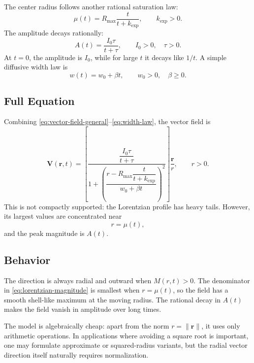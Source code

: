 \documentclass[a4paper,12pt]{article}
\begin{document}
The center radius follows another rational saturation law:
\begin{equation}
    \mu(t)
    =
    R_{\max}\frac{t}{t+k_{\mathrm{exp}}},
    \qquad k_{\mathrm{exp}}>0.
    \label{eq:center-radius}
\end{equation}
The amplitude decays rationally:
\begin{equation}
    A(t)
    =
    \frac{I_0\tau}{t+\tau},
    \qquad I_0>0,\quad \tau>0.
    \label{eq:amplitude-decay}
\end{equation}
At \(t=0\), the amplitude is \(I_0\), while for large \(t\) it decays like
\(1/t\). A simple diffusive width law is
\begin{equation}
    w(t)=w_0+\beta t,
    \qquad w_0>0,\quad \beta\ge 0.
    \label{eq:width-law}
\end{equation}

\subsection{Full Equation}

Combining \eqref{eq:vector-field-general}--\eqref{eq:width-law}, the vector
field is
\begin{equation}
    \bm{V}(\bm{r},t)
    =
    \left[
        \frac{
            \dfrac{I_0\tau}{t+\tau}
        }
        {
            1+
            \left(
                \dfrac{
                    r-R_{\max}\dfrac{t}{t+k_{\mathrm{exp}}}
                }
                {w_0+\beta t}
            \right)^2
        }
    \right]
    \frac{\bm{r}}{r},
    \qquad r>0.
    \label{eq:full-vector-field}
\end{equation}
This is not compactly supported: the Lorentzian profile has heavy tails.
However, its largest values are concentrated near
\[
    r=\mu(t),
\]
and the peak magnitude is \(A(t)\).

\subsection{Behavior}

The direction is always radial and outward when \(M(r,t)>0\). The denominator
in \eqref{eq:lorentzian-magnitude} is smallest when \(r=\mu(t)\), so the field
has a smooth shell-like maximum at the moving radius. The rational decay in
\(A(t)\) makes the field vanish in amplitude over long times.

The model is algebraically cheap: apart from the norm \(r=\|\bm{r}\|\), it uses
only arithmetic operations. In applications where avoiding a square root is
important, one may formulate approximate or squared-radius variants, but the
radial vector direction itself naturally requires normalization.
\end{document}
